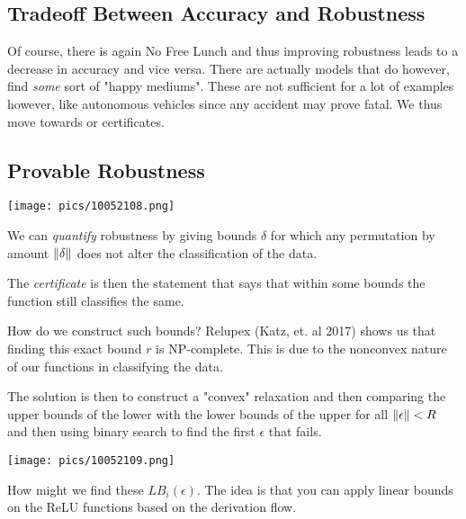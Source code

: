 \documentclass[11pt]{scrartcl}
\begin{document}
\subsection{Tradeoff Between Accuracy and Robustness}
Of course, there is again No Free Lunch and thus improving robustness leads to a decrease in accuracy and vice versa. There are actually models that do however, find \textit{some} sort of "happy mediums". These are not sufficient for a lot of examples however, like autonomous vehicles since any accident may prove fatal. We thus move towards  or certificates.

\subsection{Provable Robustness}
\begin{center}
\texttt{[image: pics/10052108.png]}
\end{center}
We can \textit{quantify} robustness by giving bounds $\delta$ for which any permutation by amount $\left\lVert\delta\right\rVert$ does not alter the classification of the data. 

The \textit{certificate} is then the statement that says that within some bounds the function still classifies the same.

How do we construct such bounds? Relupex (Katz, et. al 2017) shows us that finding this exact bound $r$ is NP-complete. This is due to the nonconvex nature of our functions in classifying the data. 

The solution is then to construct a "convex" relaxation and then comparing the upper bounds of the lower with the lower bounds of the upper for all $\left\lVert\epsilon\right\rVert<R$ and then using binary search to find the first $\epsilon$ that fails.
\begin{center}
    \texttt{[image: pics/10052109.png]}
\end{center}
How might we find these $LB_i(\epsilon)$. The idea is that you can apply linear bounds on the ReLU functions based on the derivation flow. 
\end{document}
